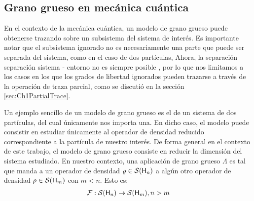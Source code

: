 \subsection{Grano grueso en mecánica cuántica}

En el contexto de la mecánica cuántica, un modelo de grano grueso puede obtenerse trazando sobre un subsistema del sistema de interés. Es importante notar que el subsistema ignorado no es necesariamente una parte que puede ser separada del sistema, como en el caso de dos partículas,  Ahora, la separación separación sistema - entorno no es siempre posible \cite{Macro-To-Micro}, por lo que nos limitamos a los casos en los que los grados de libertad ignorados pueden trazarse a través de la operación de traza parcial, como se discutió en la sección \ref{sec:Ch1PartialTrace}. 

Un ejemplo sencillo de un modelo de grano grueso es el de un sistema de dos partículas, del cual únicamente nos importa una. En dicho caso, el modelo puede consistir en estudiar únicamente al operador de densidad reducido correspondiente a la partícula de nuestro interés. De forma general en el contexto de este trabajo,  el modelo de grano grueso consiste en reducir la dimensión del sistema estudiado. En nuestro contexto, una aplicación de grano grueso $\Lambda$ es tal que manda a un operador de densidad $\varrho\in\mathcal{S}({\sf H}_{n})$ a algún otro operador de densidad $\rho\in\mathcal{S}({\sf H}_{m})$ con $m<n$. Esto es:
\begin{align}
    \mathcal{F}:\mathcal{S}({\sf H}_{n})\to \mathcal{S}({\sf H}_{m}), n>m\nonumber
\end{align}